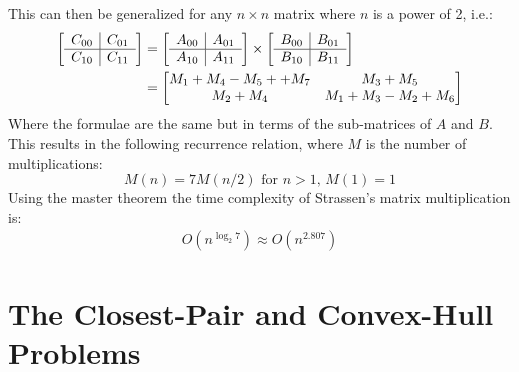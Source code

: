 \documentclass[12pt letter]{report}
\begin{document}
This can then be generalized for any $n \times n$ matrix where $n$ is a power of 2, i.e.:
\begin{align*}
  \left[
    \begin{array}{ c | c }
      C_{00} & C_{01} \\
      \hline
      C_{10} & C_{11} \\
    \end{array}
  \right] & =
  \left[
    \begin{array}{ c | c }
      A_{00} & A_{01} \\
      \hline
      A_{10} & A_{11} \\
    \end{array}
    \right]
  \times
  \left[
    \begin{array}{ c | c }
      B_{00} & B_{01} \\
      \hline
      B_{10} & B_{11} \\
    \end{array}
    \right]
  \\
          & =\begin{bmatrix}
               M_1 + M_4 - M_5 + + M_7 & M_3 + M_5             \\
               M_2 + M_4               & M_1 + M_3 - M_2 + M_6
             \end{bmatrix} \\
\end{align*}
Where the formulae are the same but in terms of the sub-matrices of $A$ and $B$. This results in the following
recurrence relation, where $M$ is the number of multiplications:
\[
  M \left( n \right) = 7 M \left( n / 2 \right) \text{ for } n > 1, \, M \left( 1 \right) = 1
\]
Using the master theorem the time complexity of Strassen's matrix multiplication is:
\begin{align*}
  O \left( n^{\log_2 7} \right) \approx O \left( n^{2.807} \right)
\end{align*}

\chapter{The Closest-Pair and Convex-Hull Problems}
\end{document}
